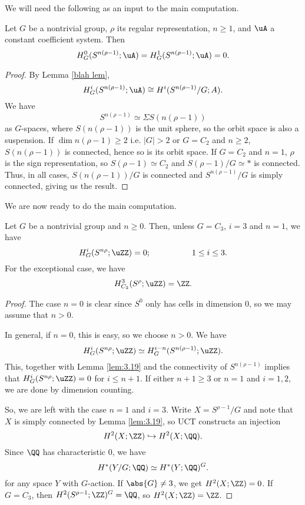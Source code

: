 We will need the following as an input to the main computation.
\begin{lemma}\cite[Example 3.19]{HHR}\label{lem:3.19}
    Let $G$ be a nontrivial group, $\rho$ its regular representation, $n\geq 1$, and $\uA$ a constant coefficient system. Then 
    \[H_G^0(S^{n(\rho-1)};\uA) =  H_G^1(S^{n(\rho-1)};\uA)= 0.\]
\end{lemma}
\begin{proof}
    By Lemma \ref{blah lem}, 
    \[H_G^i(S^{n(\rho-1)};\uA) \cong H^i(S^{n(\rho-1)}/G;A).\]
    We have
    \[S^{n(\rho-1)} \simeq \Sigma S(n(\rho-1))\]
    as $G$-spaces, where $S(n(\rho-1))$ is the unit sphere, so the orbit space is also a suspension. If $\dim n(\rho-1)\geq 2$ i.e. $|G|>2$ or $G=C_2$ and $n\geq 2$, $S(n(\rho-1))$ is connected, hence so is its orbit space. If $G=C_2$ and $n=1$, $\rho$ is the sign representation, so $S(\rho-1)\simeq C_2$ and $S(\rho-1)/G\simeq *$ is connected. Thus, in all cases, $S(n(\rho-1))/G$ is connected and $S^{n(\rho-1)}/G$ is simply connected, giving us the result.
\end{proof}

We are now ready to do the main computation.
\begin{proposition}\cite[Proposition 3.20]{HHR}
  Let $G$ be a nontrivial group and $n \geq 0$.
  Then, unless $G = C_3$, $i = 3$ and $n = 1$, we have
  \[
    H_G^i(S^{n\rho};\uZZ) = 0; \hspace{50pt} 1 \leq i \leq 3.
  \]
  For the exceptional case, we have
  \[
    H_{C_3}^3(S^\rho;\uZZ) = \ZZ.
  \]
\end{proposition}
\begin{proof}
  The case $n=0$ is clear since $S^0$ only has cells in dimension 0, so we may assume that $n>0$.

  In general, if $n = 0$, this is easy, so we choose $n > 0$.
  We have
  \[H_G^i(S^{n\rho};\uZZ) \simeq H_G^{i-n}(S^{n(\rho-1)};\uZZ).\] 
  This, together with Lemma \ref{lem:3.19} and the connectivity of $S^{n(\rho-1)}$ implies that $H_G^i(S^{n\rho};\uZZ) =0$ for $i\leq n+1$. If either $n + 1 \geq 3$ or $n=1$ and $i=1,2$, we are done by dimension counting.
  
  So, we are left with the case $n = 1$ and $i = 3$.
  Write $X = S^{\rho - 1}/G$ and note that $X$ is simply connected by Lemma \ref{lem:3.19}, so UCT constructs an injection
  \[
    H^2(X;\ZZ) \hookrightarrow H^2(X;\QQ).
  \]
  Since $\QQ$ has characteristic 0, we have
  \[
    H^*(Y/G;\QQ) \simeq H^*(Y;\QQ)^G. 
  \] for any space $Y$ with $G$-action.
  If $\abs{G} \neq 3$, we get $H^2(X;\ZZ) = 0$.
  If $G=C_3$, then $H^2(S^{\rho-1};\ZZ)^G = \QQ$, so $H^2(X;\ZZ) = \ZZ$.
\end{proof}

